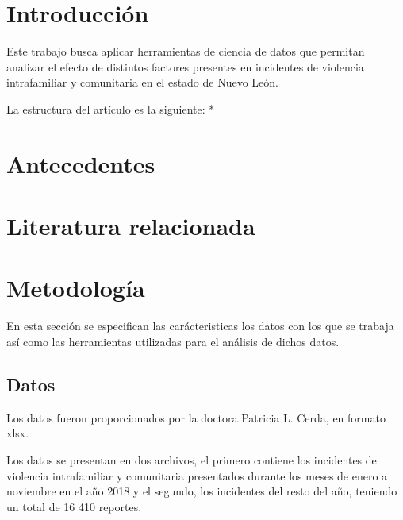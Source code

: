 \documentclass[final,5p,times]{elsarticle}
\begin{document}
\begin{frontmatter}
\begin{keyword}



\end{keyword}

\end{frontmatter}


\section{Introducci\'on} \label{intro}

Este trabajo busca aplicar herramientas de ciencia de datos que permitan analizar el efecto de distintos factores presentes en incidentes de violencia intrafamiliar y comunitaria en el estado de Nuevo Le\'on. 

La estructura del art\'iculo es la siguiente: * 
\section{Antecedentes} \label{antecedentes}

\section{Literatura relacionada} \label{estado_arte}

\section{Metodolog\'ia} \label{metodologia}

En esta secci\'on se especifican las car\'acteristicas los datos con los que se trabaja as\'i como las herramientas utilizadas para el an\'alisis de dichos datos. 

\subsection*{Datos}

Los datos fueron proporcionados por la doctora Patricia L. Cerda, en formato xlsx.

Los datos se presentan en dos archivos, el primero contiene los incidentes de violencia intrafamiliar y comunitaria presentados durante los meses de enero a noviembre en el a\~no 2018 y el segundo, los incidentes del resto del a\~no, teniendo un total de 16 410 reportes. 
\end{document}
